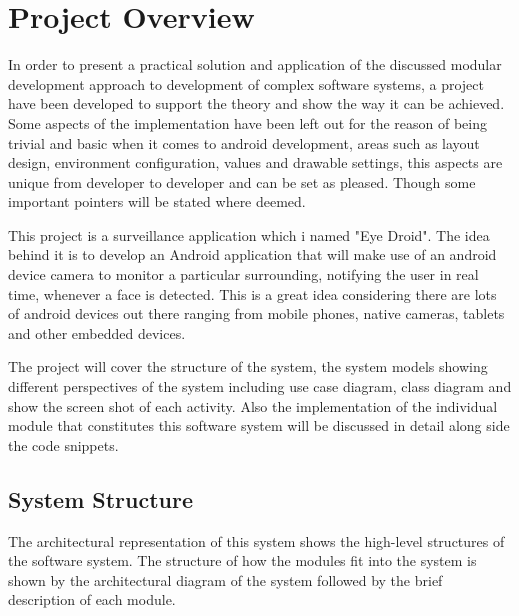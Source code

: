 \chapter{Project Overview}
In order to present a practical solution and application of the discussed modular development approach to development of complex software systems, a project have been developed to support the theory and show the way it can be achieved. Some aspects of the implementation have been left out for the reason of being trivial and basic when it comes to android development, areas such as layout design, environment configuration, values and drawable settings, this aspects are unique from developer to developer and can be set as pleased. Though some important pointers will be stated where deemed.

This project is a surveillance application which i named "Eye Droid". The idea behind it is to develop an Android application that will make use of an android device camera to monitor a particular surrounding, notifying the user in real time, whenever a face is detected. This is a great idea considering there are lots of android devices out there ranging from mobile phones, native cameras, tablets and other embedded devices.

The project will cover the structure of the system, the system models showing different perspectives of the system including use case diagram,  class diagram and show the screen shot of each activity. Also the implementation of the individual module that constitutes this software system will be discussed in detail along side the code snippets. 

\section{System Structure}
The architectural representation of this system shows the high-level structures of the software system. The structure of how the modules fit into the system is shown by the architectural diagram of the system followed by the brief description of each module.

